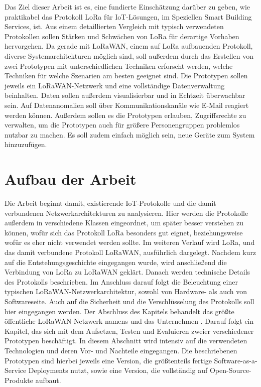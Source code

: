 Das Ziel dieser Arbeit ist es, eine fundierte Einschätzung darüber zu geben, wie praktikabel das Protokoll LoRa für IoT-Lösungen, im Speziellen Smart Building Services, ist. Aus einem detaillierten Vergleich mit typisch verwendeten Protokollen sollen Stärken und Schwächen von LoRa für derartige Vorhaben hervorgehen. Da gerade mit LoRaWAN, einem auf LoRa aufbauenden Protokoll, diverse Systemarchitekturen möglich sind, soll außerdem durch das Erstellen von zwei Prototypen mit unterschiedlichen Techniken erforscht werden, welche Techniken für welche Szenarien am besten geeignet sind. Die Prototypen sollen jeweils ein LoRaWAN-Netzwerk und eine vollständige Datenverwaltung beinhalten. Daten sollen außerdem visualisierbar und in Echtzeit überwachbar sein. Auf Datenanomalien soll über Kommunikations\-kanäle wie E-Mail reagiert werden können. Außerdem sollen es die Prototypen erlauben, Zugriffsrechte zu verwalten, um die Prototypen auch für größere Personengruppen problemlos nutzbar zu machen. Es soll zudem einfach möglich sein, neue Geräte zum System hinzuzufügen.


\section{Aufbau der Arbeit}
\label{sec:Einl:Aufbau_der_Arbeit}

Die Arbeit beginnt damit, existierende IoT-Protokolle und die damit verbundenen Netzwerkarchitekturen zu analysieren. Hier werden die Protokolle außerdem in verschiedene Klassen eingeordnet, um später besser verstehen zu können, wofür sich das Protokoll LoRa besonders gut eignet, beziehungsweise wofür es eher nicht verwendet werden sollte. Im weiteren Verlauf wird LoRa, und das damit verbundene Protokoll LoRaWAN, ausführlich dargelegt. Nachdem kurz auf die Entstehungsgeschichte eingegangen wurde, wird anschließend die Verbindung von LoRa zu LoRaWAN geklärt. Danach werden technische Details des Protokolls beschrieben. Im Anschluss darauf folgt die Beleuchtung einer typischen LoRaWAN-Netzwerkarchitektur, sowohl von Hardware- als auch von Softwareseite. Auch auf die Sicherheit und die Verschlüs\-selung des Protokolls soll hier eingegangen werden. Der Abschluss des Kapitels behandelt das größte öffentliche LoRaWAN-Netzwerk namens  und das Unternehmen . Darauf folgt ein Kapitel, das sich mit dem Aufsetzen, Testen und Evaluieren zweier verschiedener Prototypen beschäftigt. In diesem Abschnitt wird intensiv auf die verwendeten Technologien und deren Vor- und Nachteile eingegangen. Die beschriebenen Prototypen sind hierbei jeweils eine Version, die größtenteils fertige Software-as-a-Service Deployments nutzt, sowie eine Version, die vollständig auf Open-Source-Produkte aufbaut.
